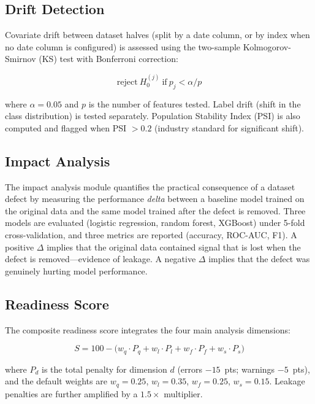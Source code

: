 \documentclass[12pt,a4paper]{report}
\begin{document}
\subsection{Drift Detection}

Covariate drift between dataset halves (split by a date column, or by index when no date
column is configured) is assessed using the two-sample Kolmogorov-Smirnov (KS) test
with Bonferroni correction:

\begin{equation}
\text{reject}\ H_0^{(j)}\ \text{if}\ p_j < \alpha / p
\label{eq:drift}
\end{equation}

where $\alpha = 0.05$ and $p$ is the number of features tested.  Label drift (shift in
the class distribution) is tested separately.  Population Stability Index (PSI) is also
computed and flagged when PSI $> 0.2$ (industry standard for significant shift).

\subsection{Impact Analysis}

The impact analysis module quantifies the practical consequence of a dataset defect by
measuring the performance \emph{delta} between a baseline model trained on the original
data and the same model trained after the defect is removed.  Three models are evaluated
(logistic regression, random forest, XGBoost) under 5-fold cross-validation, and three
metrics are reported (accuracy, ROC-AUC, F1).  A positive $\Delta$ implies that the
original data contained signal that is lost when the defect is removed---evidence of leakage.
A negative $\Delta$ implies that the defect was genuinely hurting model performance.

\subsection{Readiness Score}
\label{sec:scoring}

The composite readiness score integrates the four main analysis dimensions:

\begin{equation}
S = 100 - \bigl( w_q \cdot P_q + w_l \cdot P_l + w_f \cdot P_f + w_s \cdot P_s \bigr)
\label{eq:score}
\end{equation}

where $P_d$ is the total penalty for dimension $d$ (errors $-15$~pts; warnings $-5$~pts),
and the default weights are $w_q{=}0.25$, $w_l{=}0.35$, $w_f{=}0.25$, $w_s{=}0.15$.
Leakage penalties are further amplified by a $1.5\times$ multiplier.
\end{document}
